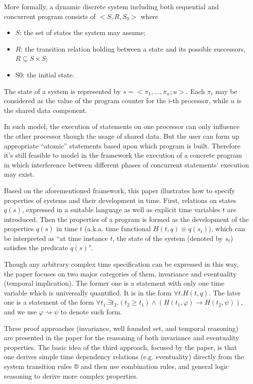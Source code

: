 \documentclass{llncs}
\begin{document}
More formally, a dynamic discrete system including both sequential and
concurrent program consists of $<S, R, S_0>$ where 
\begin{itemize}
\item
$S$: the set of states the system may assume; 
\item
$R$: the transition relation holding between a state and
its possible successors, $R \subseteq S \times S$; 
\item
S0: the initial state.
\end{itemize}
The state of a system is represented by $s = <\pi_1, \dots , \pi_n; u>$. 
Each $\pi_i$
may be considered as the value of the program counter for
the i-th processor, while $u$ is
the shared data component.

In such model, the execution of statements on one processor can only
influence the other processor though the usage of shared data. But the user
can form up appropriate “atomic” statements based upon which program
is built. Therefore it’s still feasible to model in the framework the
execution of a concrete program in which interference between different
phases of concurrent statements’ execution may exist.

Based on the aforementioned framework, this paper illustrates how
to specify properties of systems and their development in time. First, relations
on states $q(s)$, expressed in a suitable language as well as explicit time
variables $t$ are introduced. Then the properties of a program is formed as the
development of the properties $q(s)$ in time $t$ (a.k.a. time functional $H(t,
q) \equiv q(s_t))$, which can be interpreted as “at time instance $t$, the state
of the system (denoted by $s_t$) satisfies the predicate $q(s)$”.

Though any arbitrary complex time specification can be expressed in this
way, the paper focuses on two major categories of them, invariance and
eventuality (temporal implication). The former one is a statement with
only one time variable which is universally quantified. It is in the form
 $\forall t. H(t, q)$.  The later one is a
statement of the form 
$\forall t_1. \exists t_2. (t_2 \geq t_1) \land (H(t_1, \varphi) \rightarrow
H(t_2,\psi))$, and we use $\varphi \rightsquigarrow \psi$ to denote such form.

Three proof approaches (invariance, well founded
set, and temporal reasoning) are presented in the paper for the reasoning of
both invariance and eventuality properties. The basic idea of the third 
approach, focused by the paper, is that one derives simple time dependency
relations (e.g. eventuality) directly from the system transition rules ®
and then use combination rules, and general logic reasoning to derive more
complex properties.
\end{document}
